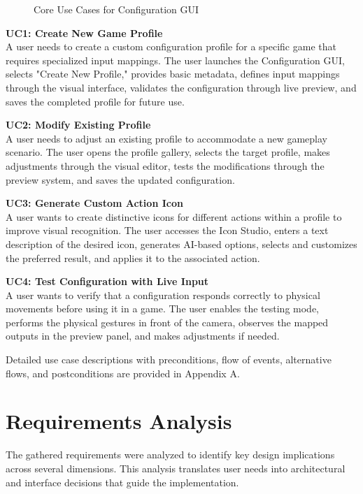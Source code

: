\begin{figure}[h]
\centering
\caption{Core Use Cases for Configuration GUI}
\label{fig:use_case_diagram}
\end{figure}

\textbf{UC1: Create New Game Profile}\\
A user needs to create a custom configuration profile for a specific game that requires specialized input mappings. The user launches the Configuration GUI, selects "Create New Profile," provides basic metadata, defines input mappings through the visual interface, validates the configuration through live preview, and saves the completed profile for future use.

\textbf{UC2: Modify Existing Profile}\\
A user needs to adjust an existing profile to accommodate a new gameplay scenario. The user opens the profile gallery, selects the target profile, makes adjustments through the visual editor, tests the modifications through the preview system, and saves the updated configuration.

\textbf{UC3: Generate Custom Action Icon}\\
A user wants to create distinctive icons for different actions within a profile to improve visual recognition. The user accesses the Icon Studio, enters a text description of the desired icon, generates AI-based options, selects and customizes the preferred result, and applies it to the associated action.

\textbf{UC4: Test Configuration with Live Input}\\
A user wants to verify that a configuration responds correctly to physical movements before using it in a game. The user enables the testing mode, performs the physical gestures in front of the camera, observes the mapped outputs in the preview panel, and makes adjustments if needed.

Detailed use case descriptions with preconditions, flow of events, alternative flows, and postconditions are provided in Appendix A.

\section{Requirements Analysis}
The gathered requirements were analyzed to identify key design implications across several dimensions. This analysis translates user needs into architectural and interface decisions that guide the implementation.

